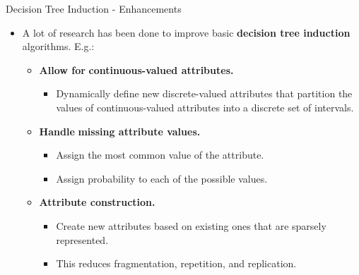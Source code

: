 \begin{frame}{Decision Tree Induction - Enhancements}
	\begin{itemize}
		\item A lot of research has been done to improve basic \textbf{decision tree induction} algorithms. E.g.:
		      \begin{itemize}
			      \item \textbf{Allow for} \textbf{\color{airforceblue}continuous-valued attributes.}
			            \begin{itemize}
				            \item Dynamically define new discrete-valued attributes that partition the values of continuous-valued attributes into a discrete set of intervals.
			            \end{itemize}
			      \item \textbf{Handle} \textbf{\color{airforceblue}missing attribute values.}
			            \begin{itemize}
				            \item Assign the most common value of the attribute.
				            \item Assign probability to each of the possible values.
			            \end{itemize}
			      \item \textbf{\color{airforceblue}Attribute construction.}
			            \begin{itemize}
				            \item Create new attributes based on existing ones that are sparsely represented.
				            \item This reduces fragmentation, repetition, and replication.
			            \end{itemize}
		      \end{itemize}
	\end{itemize}
\end{frame}

